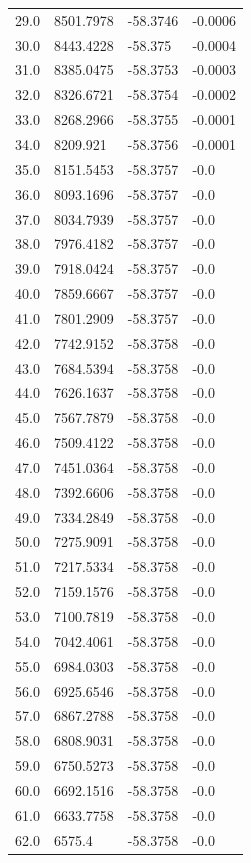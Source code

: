 \begin{table}[H]
\begin{tabular}{llll}
29.0 & 8501.7978 & -58.3746 & -0.0006 \\
30.0 & 8443.4228 & -58.375 & -0.0004 \\
31.0 & 8385.0475 & -58.3753 & -0.0003 \\
32.0 & 8326.6721 & -58.3754 & -0.0002 \\
33.0 & 8268.2966 & -58.3755 & -0.0001 \\
34.0 & 8209.921 & -58.3756 & -0.0001 \\
35.0 & 8151.5453 & -58.3757 & -0.0 \\
36.0 & 8093.1696 & -58.3757 & -0.0 \\
37.0 & 8034.7939 & -58.3757 & -0.0 \\
38.0 & 7976.4182 & -58.3757 & -0.0 \\
39.0 & 7918.0424 & -58.3757 & -0.0 \\
40.0 & 7859.6667 & -58.3757 & -0.0 \\
41.0 & 7801.2909 & -58.3757 & -0.0 \\
42.0 & 7742.9152 & -58.3758 & -0.0 \\
43.0 & 7684.5394 & -58.3758 & -0.0 \\
44.0 & 7626.1637 & -58.3758 & -0.0 \\
45.0 & 7567.7879 & -58.3758 & -0.0 \\
46.0 & 7509.4122 & -58.3758 & -0.0 \\
47.0 & 7451.0364 & -58.3758 & -0.0 \\
48.0 & 7392.6606 & -58.3758 & -0.0 \\
49.0 & 7334.2849 & -58.3758 & -0.0 \\
50.0 & 7275.9091 & -58.3758 & -0.0 \\
51.0 & 7217.5334 & -58.3758 & -0.0 \\
52.0 & 7159.1576 & -58.3758 & -0.0 \\
53.0 & 7100.7819 & -58.3758 & -0.0 \\
54.0 & 7042.4061 & -58.3758 & -0.0 \\
55.0 & 6984.0303 & -58.3758 & -0.0 \\
56.0 & 6925.6546 & -58.3758 & -0.0 \\
57.0 & 6867.2788 & -58.3758 & -0.0 \\
58.0 & 6808.9031 & -58.3758 & -0.0 \\
59.0 & 6750.5273 & -58.3758 & -0.0 \\
60.0 & 6692.1516 & -58.3758 & -0.0 \\
61.0 & 6633.7758 & -58.3758 & -0.0 \\
62.0 & 6575.4 & -58.3758 & -0.0 \\

\end{tabular}
\end{table}
